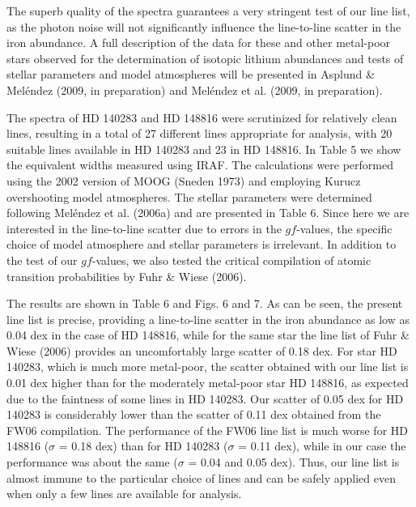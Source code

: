 \documentclass[traditabstract]{aa} %
\begin{document}
The superb quality of the spectra
guarantees a very stringent test of our line list, as the photon noise will not
significantly influence the line-to-line scatter in the iron abundance. A full
description of the data for these and other metal-poor stars observed for 
the determination of isotopic lithium abundances and tests of stellar parameters
and model atmospheres will be presented in 
Asplund \& Mel\'endez (2009, in preparation) and Mel\'endez et al. (2009, in preparation).

The spectra of HD 140283 and HD 148816 were scrutinized for relatively clean 
 lines, resulting in a total of 27 different lines appropriate for analysis,
with 20 suitable lines available in HD 140283 and 23 in HD 148816.
In Table 5 we show the equivalent widths measured using IRAF.
The calculations were performed using the 2002 version of MOOG (Sneden 1973)
and employing Kurucz overshooting model atmospheres. 
The stellar parameters were determined following Mel\'endez et al. (2006a)
and are presented in Table 6.
Since here we are interested in the line-to-line scatter due to errors in the 
$gf$-values, the specific choice of model atmosphere and stellar parameters 
is irrelevant.
In addition to the test of our $gf$-values, we also tested the critical compilation 
of atomic transition probabilities by Fuhr \& Wiese (2006). 

The results are shown in Table 6 and Figs. 6 and 7. As can be seen, the
present line list is precise, providing a line-to-line scatter 
in the iron abundance as low as 0.04 dex in the case of HD 148816, while for
the same star the line list of Fuhr \& Wiese (2006) provides an uncomfortably
large scatter of 0.18 dex. For star HD 140283, which is much more metal-poor,
the scatter obtained with our line list is 0.01 dex higher than for
the moderately metal-poor star HD 148816, as expected due to the 
faintness of some  lines in HD 140283. Our scatter of 0.05 dex
for HD 140283 is considerably lower than the scatter of 0.11 dex
obtained from the FW06 compilation. The performance of the FW06 line list
is much worse for HD 148816 ($\sigma$ = 0.18 dex) than for 
HD 140283 ($\sigma$ = 0.11 dex), while in our case the performance
was about the same ($\sigma$ = 0.04 and 0.05 dex). Thus, our line
list is almost immune to the particular choice of lines and can
be safely applied even when only a few lines are available for analysis.
\end{document}
